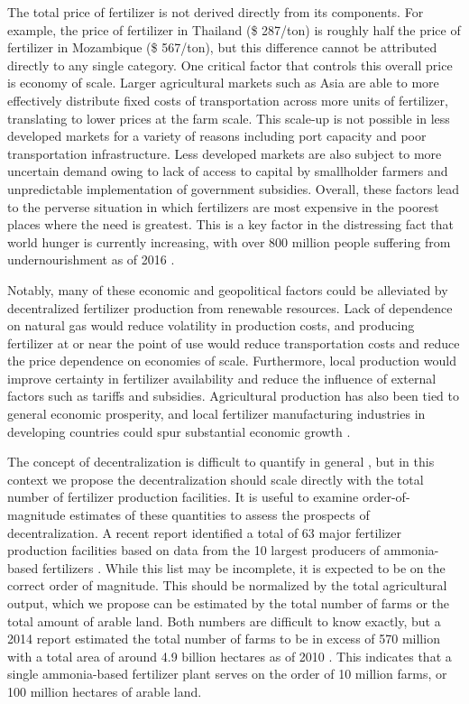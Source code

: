 The total price of fertilizer is not derived directly from its components. For example, the price of fertilizer in Thailand (\$ 287/ton) is roughly half the price of fertilizer in Mozambique (\$ 567/ton), but this difference cannot be attributed directly to any single category. One critical factor that controls this overall price is economy of scale. Larger agricultural markets such as Asia are able to more effectively distribute fixed costs of transportation across more units of fertilizer, translating to lower prices at the farm scale. This scale-up is not possible in less developed markets for a variety of reasons including port capacity and poor transportation infrastructure. Less developed markets are also subject to more uncertain demand owing to lack of access to capital by smallholder farmers and unpredictable implementation of government subsidies. Overall, these factors lead to the perverse situation in which fertilizers are most expensive in the poorest places where the need is greatest. This is a key factor in the distressing fact that world hunger is currently increasing, with over 800 million people suffering from undernourishment as of 2016 \cite{FAO_2017}.

Notably, many of these economic and geopolitical factors could be alleviated by decentralized fertilizer production from renewable resources. Lack of dependence on natural gas would reduce volatility in production costs, and producing fertilizer at or near the point of use would reduce transportation costs and reduce the price dependence on economies of scale. Furthermore, local production would improve certainty in fertilizer availability and reduce the influence of external factors such as tariffs and subsidies. Agricultural production has also been tied to general economic prosperity, and local fertilizer manufacturing industries in developing countries could spur substantial economic growth \cite{McArthur_2017}.

The concept of decentralization is difficult to quantify in general \cite{Schneider_2003}, but in this context we propose the decentralization should scale directly with the total number of fertilizer production facilities. It is useful to examine order-of-magnitude estimates of these quantities to assess the prospects of decentralization. A recent report identified a total of 63 major fertilizer production facilities based on data from the 10 largest producers of ammonia-based fertilizers \cite{McArthur_2017}. While this list may be incomplete, it is expected to be on the correct order of magnitude. This should be normalized by the total agricultural output, which we propose can be estimated by the total number of farms or the total amount of arable land. Both numbers are difficult to know exactly, but a 2014 report estimated the total number of farms to be in excess of 570 million with a total area of around 4.9 billion hectares as of 2010 \cite{FAO_2014,Lowder_2016}. This indicates that a single ammonia-based fertilizer plant serves on the order of 10 million farms, or 100 million hectares of arable land. 

